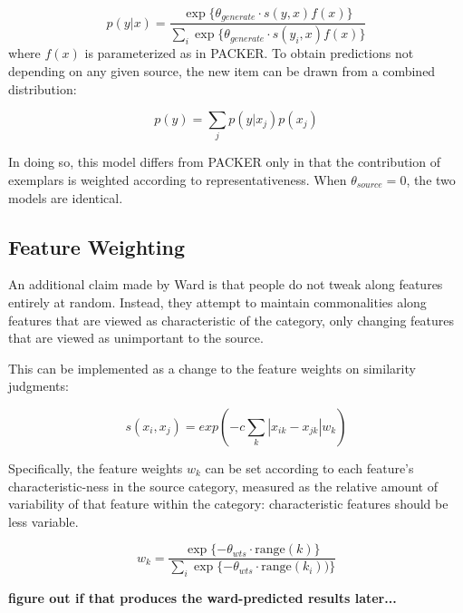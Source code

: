 \documentclass[12pt]{article}
\begin{document}
\begin{equation}
    p(y | x)  = \dfrac
    { \exp \{\theta_{generate} \cdot s(y, x) f(x) \} }
    {\sum_i{\exp \{ \theta_{generate} \cdot s(y_i, x) f(x) \}}}
\end{equation}
% 
where $f(x)$ is parameterized as in PACKER. To obtain predictions not depending on any given source, the new item can be drawn from a combined distribution:

\begin{equation}
    p(y) = \sum_j { p(y|x_j)p(x_j) }
\end{equation}

In doing so, this model differs from PACKER only in that the contribution of exemplars is weighted according to representativeness. When $\theta_{source} = 0$, the two models are identical.


\subsection{Feature Weighting}

An additional claim made by Ward is that people do not tweak along features entirely at random. Instead, they attempt to maintain commonalities along features that are viewed as characteristic of the category, only changing features that are viewed as unimportant to the source.

This can be implemented as a change to the feature weights on similarity judgments:

\begin{equation}
  s(x_i,x_j) = exp( {-c \sum_{k}{|x_{ik} - x_{jk}|}w_k} )
\end{equation}

Specifically, the feature weights $w_k$ can be set according to each feature's characteristic-ness in the source category, measured as the relative amount of variability of that feature within the category: characteristic features should be less variable.

\begin{equation}
    w_k = \dfrac
    { \exp \{-\theta_{wts} \cdot \text{range}(k) \} }
    {\sum_i{\exp \{ -\theta_{wts}  \cdot  \text{range}(k_i)) \}}}
\end{equation}

\textbf{figure out if that produces the ward-predicted results later...}

\clearpage


\end{document}
